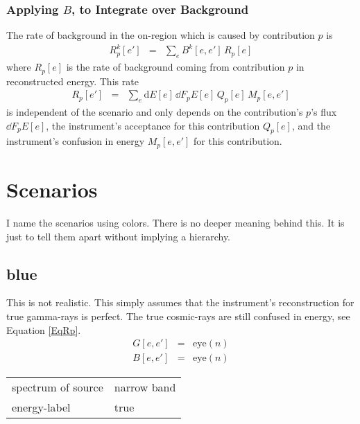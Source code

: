 \documentclass{article}%
\begin{document}
            \subsubsection*{Applying $B$, to Integrate over Background}
                The rate of background in the on-region which is caused by contribution $p$ is
                \begin{eqnarray}
                    R^k_p[e'] &=& \sum_{e} B^k[e, e'] \, R_p[e]
                \end{eqnarray}
                where $R_p[e]$ is the rate of background coming from contribution $p$ in reconstructed energy.
                This rate
                \begin{eqnarray}
                    R_p[e'] &=& \sum_{e} \text{d}E[e] \, \dd{F_p}{E}[e] \, Q_p[e] \, M_p[e, e']
                    \label{EqRp}
                \end{eqnarray}
                 is independent of the scenario and only depends on the contribution's $p$'s flux $\dd{F_p}{E}[e]$, the instrument's acceptance for this contribution $Q_p[e]$, and the instrument's confusion in energy $M_p[e, e']$ for this contribution.
    \section{Scenarios}
        I name the scenarios using colors. There is no deeper meaning behind this. It is just to tell them apart without implying a hierarchy.
    \subsection{blue}
    This is not realistic. This simply assumes that the instrument's reconstruction for true gamma-rays is perfect.
    The true cosmic-rays are still confused in energy, see Equation \ref{EqRp}.
    \begin{eqnarray}
        G[e, e'] &=& \mathrm{eye}(n)
        \\
        B[e, e'] &=& \mathrm{eye}(n)
    \end{eqnarray}
    \begin{center}
        \begin{tabular}{ll}
            spectrum of source & narrow band\\
            energy-label & true\\
        \end{tabular}
    \end{center}
\end{document}
